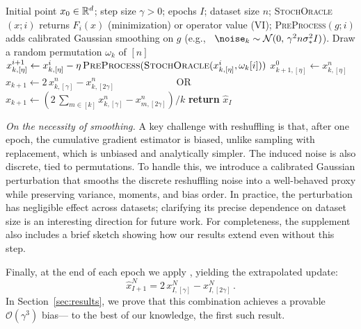 {\begin{algorithm}[ht]
\caption{\textsc{SGD--\RRrom$\oplus$\RRresh}}
\label{alg:rrrom-rrresh}
\begin{algorithmic}[1]
\footnotesize
\Require Initial point $x_0\in\mathbb{R}^d$; step size $\gamma>0$; epochs $I$; dataset size $n$;
\Statex \hspace{\algorithmicindent} \textsc{StochOracle}$(x;i)$ returns $F_i(x)$ (minimization) or operator value (VI);
\Statex \hspace{\algorithmicindent} \textsc{PreProcess}$(g;i)$ adds calibrated Gaussian smoothing on $g$ (e.g., $\;\;\noise_k \sim \mathcal{N}(0,\, \gamma^2 n \sigma_*^2 I)$).
 
  \For{$\eta=\gamma,2\gamma$}   
  \State Draw a random permutation $\omega_k$ of $[n]$
   
    \State $x^{i+1}_{k,[\eta]}   \gets x^{i}_{k,[\eta]}   - \eta\, \textsc{PreProcess}( \textsc{StochOracle}(x^{i}_{k,[\eta]},  \omega_k[i]))$
  \EndFor
    \State $x^{0}_{k+1,[\eta]} \gets x^{n}_{k,[\eta]}$ %
  \EndFor
  \State $\hat{x}_{k+1} \gets 2\,x^{n}_{k,[\gamma]} - x^{n}_{k,[2\gamma]}$   
  \Statex \ \ \ \  \ \ \ \ \ \ \ \ OR
  \State $\hat{x}_{k+1} \gets (2\,\sum_{m\in[k]}x^{n}_{k,[\gamma]} - x^{n}_{m,[2\gamma]})/k$ 
\EndFor
\State \textbf{return} $\hat{x}_{I}$ 
\end{algorithmic}
\end{algorithm}

\emph{On the necessity of smoothing.}
A key challenge with reshuffling is that, after one epoch, the cumulative gradient estimator is biased, unlike sampling with replacement, which is unbiased and analytically simpler. The induced noise is also discrete, tied to permutations. 
To handle this, we introduce a calibrated Gaussian perturbation that smooths the discrete reshuffling noise into a well-behaved proxy while preserving variance, moments, and bias order. In practice, the perturbation has negligible effect across datasets; clarifying its precise dependence on dataset size is an interesting direction for future work. For completeness, the supplement also includes a brief sketch showing how our results extend even without this step.

Finally, at the end of each epoch we apply \RRrom, yielding the extrapolated update:
\begin{equation}\tag{SGD-\RRrom$\oplus$\RRresh (outer-loop)}
    \hat{x}^N_{I+1} = 2\,x^{N}_{I,[\gamma]} - x^{N}_{I,[2\gamma]}\,.
    \label{SGD-4R2}
\end{equation}
In Section~\ref{sec:results}, we prove that this combination achieves a provable $\mathcal{O}(\gamma^3)$ bias— to the best of our knowledge, the first such result. 

}
